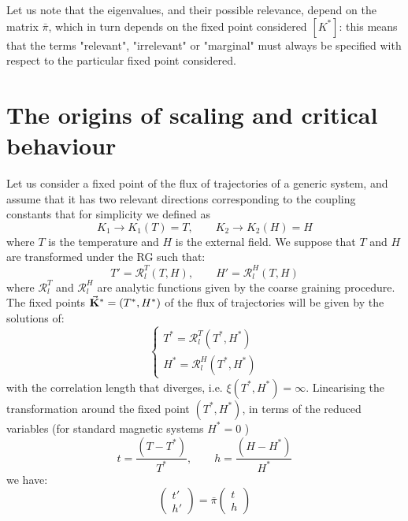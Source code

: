 \documentclass[../main/main.tex]{subfiles}
\begin{document}
\begin{remark}
Let us note that the eigenvalues, and their possible relevance, depend on the matrix \( \bar{\pi }  \), which in turn depends on the fixed point considered \( [K^*] \): this means that the terms "relevant", "irrelevant" or "marginal" must always be specified with respect to the particular fixed point considered.
\end{remark}


\section{The origins of scaling and critical behaviour}
Let us consider a fixed point of the flux of trajectories of a generic system, and assume that it has two relevant directions corresponding to the coupling constants that for simplicity we defined as
\begin{equation*}
  K_1 \rightarrow K_1 (T) = T, \qquad K_2 \rightarrow K_2 (H) = H
\end{equation*}
where \( T \) is the temperature and \( H \) is the external field.  We suppose that
\( T \) and \( H \)  are transformed under the RG such that:
\begin{equation*}
  T' = \mathcal{R}_l ^T (T,H), \qquad H' = \mathcal{R}_l ^H (T,H)
\end{equation*}
where \( \mathcal{R}_l ^T  \) and \( \mathcal{R}_l ^H  \) are analytic functions given by the coarse graining procedure.  The fixed points \( \va{K}^* = (T^*,H^*) \)  of the flux of trajectories will be given by the solutions of:
\begin{equation*}
  \begin{cases}
   T^* = \mathcal{R}_l ^T (T^*,H^*)\\
   H^* = \mathcal{R}_l ^H (T^*,H^*)
  \end{cases}
\end{equation*}
with the correlation length that diverges, i.e. \( \xi (T^*,H^*) = \infty  \).
Linearising the transformation around the fixed point \( (T^*,H^*) \), in terms of the reduced variables (for standard magnetic systems \( H^*=0 \) )
\begin{equation*}
  t = \frac{(T-T^*)}{T^*}, \qquad h = \frac{(H-H^*)}{H^*}
\end{equation*}
we have:
\begin{equation}
  \begin{pmatrix}
  t' \\
  h'
  \end{pmatrix}
  = \bar{\pi }
  \begin{pmatrix}
  t \\
  h
  \end{pmatrix}
\end{equation}
\end{document}
